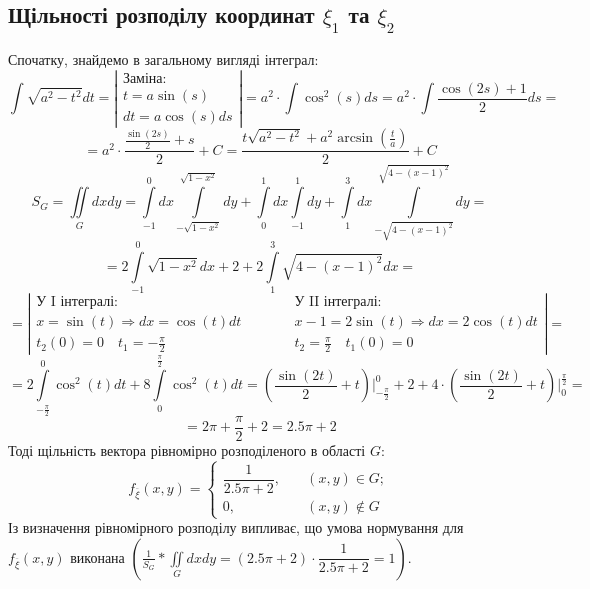 \documentclass[14pt,a4paper]{scrartcl}
\theoremstyle{definition}
\theoremstyle{remark}
\theoremstyle{definition}
\theoremstyle{definition}
\begin{document}
\subsection{Щільності розподілу координат $\xi_1$ та  $\xi_2$}
Спочатку, знайдемо в загальному вигляді інтеграл:
$$
 \int\limits_{}^{}{\sqrt{a^2 - t^2}dt} = \left| \begin{gathered}
  \text{Заміна:}\\
	t = a\sin{(s)}\\
	dt = a \cos{(s)} ds
 \end{gathered} \right| =  a^2 \cdot \int\limits_{}^{}{\cos^2{(s)}ds } = a^2 \cdot \int{ \frac{\cos{(2s)}+1}{2} ds } =
$$
$$
= a^2 \cdot \frac{ \frac{\sin{(2s)} }{2} +s}{2} +C =   \frac{ t\sqrt{a^2 - t^2} +a^2\arcsin{\left( \frac{t}{a}  \right) }}{2} +C
$$
$$S_{G} =   \iint\limits_{G}{dxdy} =  \int\limits_{-1}^{ 0}{dx  \int\limits_{-\sqrt{1 -x^2}}^{ \sqrt{1 -x^2}}{dy}} +
 \int\limits_{0}^{1}{dx  \int\limits_{-1}^{ 1}{dy}} +  \int\limits_{1}^{3}{dx  \int\limits_{-\sqrt{4 -(x-1)^2}}^{ \sqrt{4 -(x-1)^2}}{dy}} = $$
 $$
 = 2  \int\limits_{-1}^{0}{ \sqrt{1 - x^2}dx} + 2 +  2\int\limits_{1}^{3}{\sqrt{4 -(x-1)^2}dx } = $$
 $$ =\left| \begin{gathered}
\text{У I інтегралі:} \\
 x = \sin{(t)} \Rightarrow dx = \cos{(t)}dt\\
t_2(0) = 0 \quad t_1 = -\frac{\pi}{2}
 \end{gathered} \qquad \quad \begin{gathered}\text{У II інтегралі:} \\
  x-1 = 2\sin{(t)} \Rightarrow dx = 2\cos{(t)}dt\\
  t_2 = \frac{\pi}{2}\quad  t_1(0) = 0
  \end{gathered}\right| =
 $$
$$
=  2\int\limits_{- \frac{\pi}{2} }^{0}{\cos^2{(t)}dt } + 8  \int\limits_{0}^{ \frac{\pi}{2} 	}{ \cos^2{(t)}dt } =
\left( \frac{\sin{(2t)}}{2}   + t  \right)  \Bigg|_{ -\frac{\pi}{2} }^0 + 2 + 4\cdot \left(  \frac{\sin{(2t)}}{2}   + t  \right) \Bigg|^{ \frac{\pi}{2} }_0 =
$$
$$
= 2\pi + \frac{\pi}{2} + 2 = 2.5 \pi + 2
$$
Тоді
щільність
вектора
рівномірно
розподіленого в області $G$:
\def\fx{f_{\overline{\xi}}}
$$
\fx  (x,y ) = \begin{cases}
	\dfrac{1}{ 2.5\pi + 2}, \quad&(x,y) \in G; \\
	0, \quad& (x,y) \notin G
\end{cases}
$$
Із визначення рівномірного розподілу випливає, що умова нормування для $\fx (x,y)$ виконана $ \left( \frac{1}{S_G}  * \iint\limits_{G}{dxdy} = (2.5\pi +2 )\cdot \dfrac{1}{2.5\pi + 2} =1 \right)$.\\
\end{document}
